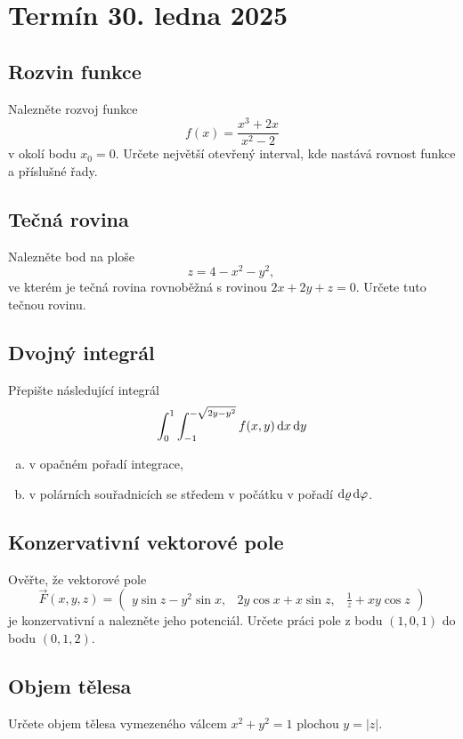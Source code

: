 \section{Termín 30. ledna 2025}

\subsection{Rozvin funkce}
Nalezněte rozvoj funkce
\[
    f(x) = \frac{x^3+2x}{x^2 - 2}
\]
v okolí bodu $x_0 = 0$. Určete největší otevřený interval, kde nastává rovnost funkce a příslušné řady.

\subsection{Tečná rovina}
Nalezněte bod na ploše
\[
    z = 4 - x^2 - y^2 \text{, }
\]
ve kterém je tečná rovina rovnoběžná s rovinou $2x + 2y + z=0$. Určete tuto tečnou rovinu.

\subsection{Dvojný integrál}
Přepište následující integrál
\[
    \int_{0}^{1} \int_{-1}^{-\sqrt{2y - y^2}} f(x, y) \mathop{}\!\mathrm{d} x \mathop{}\!\mathrm{d} y
\]
\begin{enumerate}[a), noitemsep]
    \item v opačném pořadí integrace,
    \item v polárních souřadnicích se středem v počátku v pořadí $\mathop{}\!\mathrm{d} \varrho \mathop{}\!\mathrm{d} \varphi$.
\end{enumerate}


\subsection{Konzervativní vektorové pole}
Ověřte, že vektorové pole
\[
    \vec{F} (x, y, z) =
    \begin{pmatrix}
        y \sin z - y^2 \sin x, & 2y \cos x + x \sin z, & \frac{1}{z} + xy \cos z
    \end{pmatrix}
\]
je konzervativní a nalezněte jeho potenciál. Určete práci pole z bodu $(1, 0, 1)$ do bodu $(0, 1, 2)$.

\subsection{Objem tělesa}
Určete objem tělesa vymezeného válcem $x^2 + y^2 = 1$ plochou $y = |z|$.